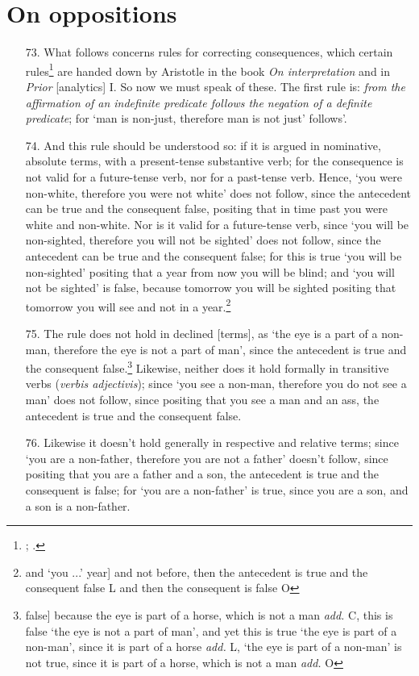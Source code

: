 \section{On oppositions}
\begin{itemize}
\item[73.] What follows concerns rules for correcting consequences, which certain rules\footnote{\cite[6, p. 17a.25]{AristotlePeriHerm}; \cite[I, 46, p. 51b.5]{AristotlePrA}.} are handed down by Aristotle in the book \textit{On interpretation} and in \textit{Prior} [analytics] I. So now we must speak of these. The first rule is: \textit{from the affirmation of an indefinite predicate follows the negation of a definite predicate}; for `man is non-just, therefore man is not just' follows'.
\item[74.] And this rule should be understood so: if it is argued in nominative, absolute terms, with a present-tense substantive verb; for the consequence is not valid for a future-tense verb, nor for a past-tense verb. Hence, `you were non-white, therefore you were not white' does not follow, since the antecedent can be true and the consequent false, positing that in time past you were white and non-white. Nor is it valid for a future-tense verb, since `you will be non-sighted, therefore you will not be sighted' does not follow, since the antecedent can be true and the consequent false; for this is true `you will be non-sighted' positing that a year from now you will be blind; and `you will not be sighted' is false, because tomorrow you will be sighted positing that tomorrow you will see and not in a year.\footnote{and `you ...' year] and not before, then the antecedent is true and the consequent false L and then the consequent is false O}
\item[75.] The rule does not hold in declined [terms], as `the eye is a part of a non-man, therefore the eye is not a part of man', since the antecedent is true and the consequent false.\footnote{false] because the eye is part of a horse, which is not a man \textit{add.} C, this is false `the eye is not a part of man', and yet this is true `the eye is part of a non-man', since it is part of a horse \textit{add.} L, `the eye is part of a non-man' is not true, since it is part of a horse, which is not a man \textit{add.} O} Likewise, neither does it hold formally in transitive verbs (\textit{verbis adjectivis}); since `you see a non-man, therefore you do not see a man' does not follow, since positing that you see a man and an ass, the antecedent is true and the consequent false.
\item[76.] Likewise it doesn't hold generally in respective and relative terms; since `you are a non-father, therefore you are not a father' doesn't follow, since positing that you are a father and a son, the antecedent is true and the consequent is false; for `you are a non-father' is true, since you are a son, and a son is a non-father.

\end{itemize}
